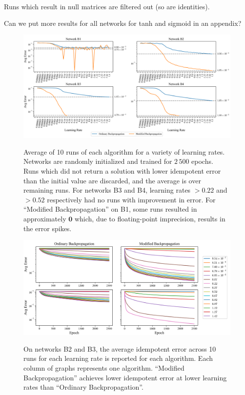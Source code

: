 \documentclass{article}
\theoremstyle{plain}
\theoremstyle{definition}
\theoremstyle{remark}
\begin{document}
Runs which result in null matrices are filtered out (so are identities).

Can we put more results for all networks for tanh and sigmoid in an appendix?

\begin{figure}[htbp]
    \centering
    \includegraphics[width=\textwidth]{./resources/abs_err_b1234.png}
    \label{fig:avg-abs-err}
    \caption{Average of 10 runs of each algorithm for a variety of learning rates. Networks are randomly initialized and trained for $2\,500$ epochs. Runs which did not return a solution with lower idempotent error than the initial value are discarded, and the average is over remaining runs. For networks B3 and B4, learning rates $>0.22$ and $>0.52$ respectively had no runs with improvement in error. For ``Modified Backpropagation'' on B1, some runs resulted in approximately $\bm{0}$ which, due to floating-point imprecision, results in the error spikes.}
\end{figure}

\begin{figure}[htbp]
    \centering
    \includegraphics[width=\textwidth]{./resources/runs_err_b23.png}
    \label{fig:avg-epoch-err}
    \caption{On networks B2 and B3, the average idempotent error across 10 runs for each learning rate is reported for each algorithm. Each column of graphs represents one algorithm. ``Modified Backpropagation'' achieves lower idempotent error at lower learning rates than ``Ordinary Backpropagation''.}
\end{figure}
\end{document}
